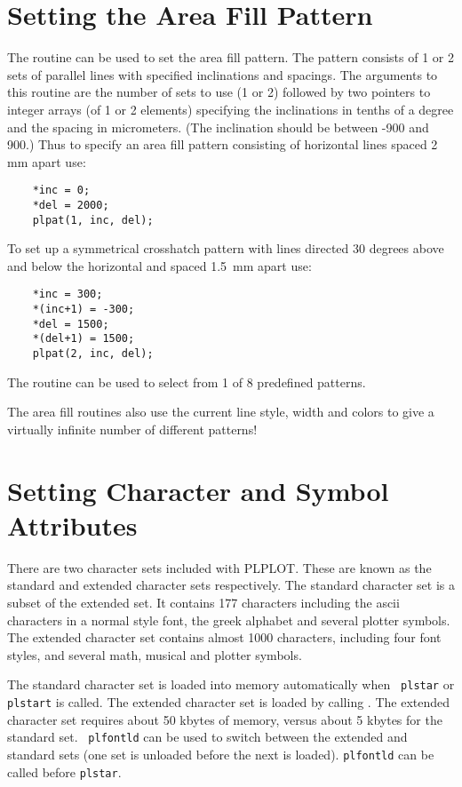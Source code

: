 
\section {Setting the Area Fill Pattern}

The routine  can be used to set the area fill pattern. The
pattern consists of 1 or 2 sets of parallel lines with specified
inclinations and spacings. The arguments to this routine are the
number of sets to use (1 or 2) followed by two pointers to integer
arrays (of 1 or 2 elements) specifying the inclinations in tenths
of a degree and the spacing in micrometers. (The inclination should
be between -900 and 900.) Thus to specify an area fill pattern consisting
of horizontal lines spaced 2\, mm apart use:
\begin{verbatim}
    *inc = 0;
    *del = 2000;
    plpat(1, inc, del);
\end{verbatim}
To set up a symmetrical crosshatch pattern with lines directed 30 degrees
above and below the horizontal and spaced 1.5\, mm apart use:
\begin{verbatim}
    *inc = 300;
    *(inc+1) = -300;
    *del = 1500;
    *(del+1) = 1500;
    plpat(2, inc, del);
\end{verbatim}

The routine  can be used to select from 1 of 8 predefined
patterns.

The area fill routines also use the current line style, width and
colors to give a virtually infinite number of different patterns!


\section {Setting Character and Symbol Attributes}

There are two character sets included with PLPLOT. These are known as
the standard and extended character sets respectively. The standard
character set is a subset of the extended set. It contains 177
characters including the ascii characters in a normal style font, 
the greek alphabet and several plotter symbols. The extended character
set contains almost 1000 characters, including four font styles, 
and several math, musical and plotter symbols.

The standard character set is loaded into memory automatically when {\tt
plstar} or {\tt plstart} is called. The extended character set is loaded by
calling .  The extended character set requires about 50
kbytes of memory, versus about 5 kbytes for the standard set. {\tt
plfontld} can be used to switch between the extended and standard sets
(one set is unloaded before the next is loaded).  {\tt plfontld} can be
called before {\tt plstar}.


